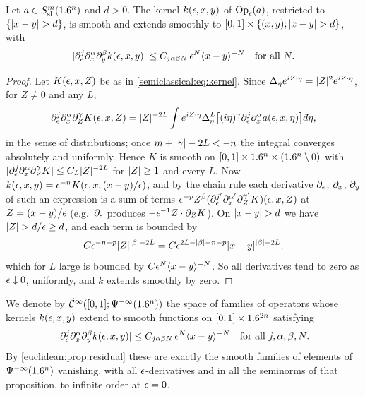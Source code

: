 \begin{lemma}\label{semiclassical:lem:off-diagonal}
  Let $a\in S^{m}_{\mathrm{sl}}(1.6^n)$ and $d>0$. The kernel $k(\epsilon,x,y)$ of
  $\operatorname{Op}_\epsilon(a)$, restricted to $\{\lvert x-y\rvert>d\}$, is smooth and extends
  smoothly to $[0,1]\times\{(x,y);\lvert x-y\rvert>d\}$, with
  \begin{equation*}
    \lvert \partial^j_\epsilon\partial^\alpha_x\partial^\beta_yk(\epsilon,x,y)\rvert\le C_{j\alpha\beta N}\,\epsilon^N\langle x-y\rangle^{-N}
    \quad\text{for all }N.
  \end{equation*}
\end{lemma}
\begin{proof}
  Let $K(\epsilon,x,Z)$ be as in \eqref{semiclassical:eq:kernel}. Since
  $\Delta_\eta e^{iZ\cdot\eta}=\lvert Z\rvert^2e^{iZ\cdot\eta}$, for $Z\ne0$ and any $L$,
  \begin{equation*}
    \pa^j_\eps\pa^\alpha_x\pa^\gamma_ZK(\eps,x,Z)=\abs Z^{-2L}\int e^{iZ\cdot\eta}
    \Delta_\eta^L\bigl[(i\eta)^\gamma\pa^j_\eps\pa^\alpha_xa(\eps,x,\eta)\bigr]\,\dbar\eta,
  \end{equation*}
  in the sense of distributions; once $m+\lvert \gamma\rvert-2L<-n$ the integral converges
  absolutely and uniformly. Hence $K$ is smooth on $[0,1]\times1.6^n\times(1.6^n\setminus0)$
  with $\lvert \partial^j_\epsilon\partial^\alpha_x\partial^\gamma_ZK\rvert\le C_{L}\lvert Z\rvert^{-2L}$ for
  $\lvert Z\rvert\ge1$ and every $L$. Now $k(\epsilon,x,y)=\epsilon^{-n}K(\epsilon,x,(x-y)/\epsilon)$, and
  by the chain rule each derivative $\partial_\epsilon$, $\partial_x$, $\partial_y$ of such an
  expression is a sum of terms $\epsilon^{-p}Z^\beta(\partial^{j'}_\epsilon\partial^{\alpha'}_x\partial^{\gamma'}_ZK)(\epsilon,x,Z)$
  at $Z=(x-y)/\epsilon$ (e.g.\ $\partial_\epsilon$ produces $-\epsilon^{-1}Z\cdot\partial_ZK$). On
  $\lvert x-y\rvert>d$ we have $\lvert Z\rvert>d/\epsilon\ge d$, and each term is bounded by
  \begin{equation*}
    C\epsilon^{-n-p}\lvert Z\rvert^{\lvert \beta\rvert-2L}=C\epsilon^{2L-\lvert \beta\rvert-n-p}\lvert x-y\rvert^{\lvert \beta\rvert-2L},
  \end{equation*}
  which for $L$ large is bounded by $C\epsilon^N\langle x-y\rangle^{-N}$. So all derivatives
  tend to zero as $\epsilon\downarrow0$, uniformly, and $k$ extends smoothly by zero.
\end{proof}

We denote by $\dot{\mathcal{C}}^\infty([0,1];\Psi^{-\infty}(1.6^n))$ the space of families of
operators whose kernels $k(\epsilon,x,y)$ extend to smooth functions on
$[0,1]\times1.6^{2n}$ satisfying
\begin{equation}\label{semiclassical:eq:residual-kernel}
  \lvert \partial^j_\epsilon\partial^\alpha_x\partial^\beta_yk(\epsilon,x,y)\rvert\le C_{j\alpha\beta N}\,\epsilon^N\langle x-y\rangle^{-N}
  \quad\text{for all }j,\alpha,\beta,N.
\end{equation}
By \cref{euclidean:prop:residual} these are exactly the smooth families of
elements of $\Psi^{-\infty}(1.6^n)$ vanishing, with all $\epsilon$-derivatives and in
all the seminorms of that proposition, to infinite order at $\epsilon=0$.

